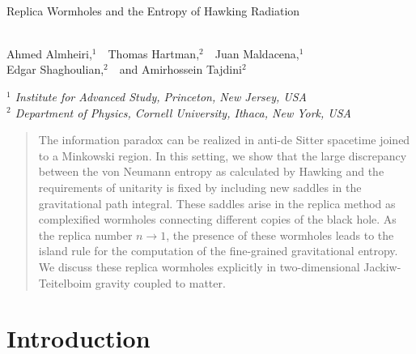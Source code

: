 \documentclass[11pt,oneside,letterpaper]{article}
\numberwithin{equation}{section}
\begin{document}
\onehalfspacing

\begin{center}

~
\vskip5mm

{\LARGE  {
Replica Wormholes and the Entropy of Hawking Radiation \\
\ \\
}}

\vskip10mm

Ahmed Almheiri,$^1$\ \ Thomas Hartman,$^{2}$\ \ Juan Maldacena,$^{1}$\\  Edgar Shaghoulian,$^{2}$\ \  and Amirhossein Tajdini$^{2}$

\vskip5mm

{\it $^1$ Institute for Advanced Study, Princeton, New Jersey, USA } \\
\vskip5mm
{\it $^2$ Department of Physics, Cornell University, Ithaca, New York, USA
} 

\vskip5mm





\end{center}

\vspace{4mm}

\begin{abstract}
\noindent

The information paradox can be realized in anti-de Sitter spacetime joined to a Minkowski region. In this setting, we show that the large discrepancy between the von Neumann entropy as calculated by Hawking and the requirements of unitarity is fixed by including new saddles in the gravitational path integral. These saddles arise in the replica method as complexified wormholes connecting different copies of the black hole. As the replica number $n \to 1$, the presence of these wormholes leads to the island rule for the computation of the fine-grained gravitational entropy. 
We discuss these replica wormholes explicitly in two-dimensional Jackiw-Teitelboim gravity coupled to matter. 

 
 \end{abstract}


\pagebreak
\pagestyle{plain}

\setcounter{tocdepth}{2}
{}
\vfill
\tableofcontents

\newpage

\section{Introduction}
\end{document}
